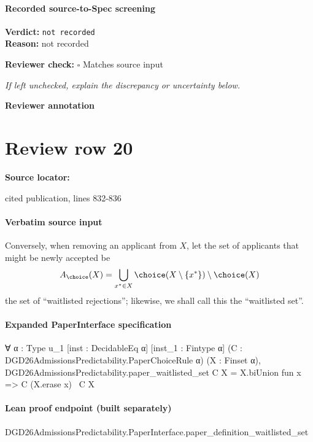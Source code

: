 \documentclass[10pt]{article}
\newcommand{\reviewerbox}{%
  \par\noindent\fbox{\parbox{0.96\linewidth}{\rule{0pt}{0.38in}}}\par
}
\newcommand{\reviewmatch}[1]{%
  \par\noindent\textbf{Reviewer check:} $\square$\; #1\par
  \noindent\emph{If left unchecked, explain the discrepancy or uncertainty below.}\par
}
\begin{document}
\paragraph{Recorded source-to-Spec screening}
\textbf{Verdict:} \texttt{not recorded}
\\
\textbf{Reason:} not recorded
\reviewmatch{Matches source input}
\noindent\textbf{Reviewer annotation}\par
\reviewerbox
\clearpage
\hypertarget{source-claim-1c2136cbe341a833}{}
\section*{Review row 20}
\textbf{Source locator:} {\footnotesize\raggedright cited publication, lines 832-\allowbreak{}836\par}
\paragraph{Verbatim source input}
\begin{ReviewVerbatim}
Conversely, when removing an applicant from $X$, let the set of applicants that might be newly accepted be
\begin{equation}
A_\choice(X) = \bigcup_{x^*\in X} \choice(X \setminus \{x^*\}) \setminus \choice(X)
\end{equation}
the set of ``waitlisted rejections''; likewise, we shall call this the ``waitlisted set''.
\end{ReviewVerbatim}


\paragraph{Expanded PaperInterface specification}
\begin{ReviewVerbatim}
∀ {α : Type u_1} [inst : DecidableEq α] [inst_1 : Fintype α] (C : DGD26AdmissionsPredictability.PaperChoiceRule α)
  (X : Finset α), DGD26AdmissionsPredictability.paper_waitlisted_set C X = X.biUnion fun x => C (X.erase x) \ C X
\end{ReviewVerbatim}

\paragraph{Lean proof endpoint (built separately)}\begin{ReviewVerbatim}
DGD26AdmissionsPredictability.PaperInterface.paper_definition_waitlisted_set
\end{ReviewVerbatim}
\end{document}
